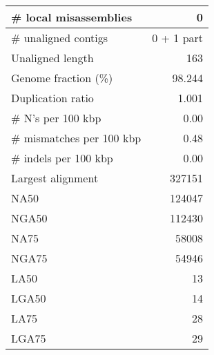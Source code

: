 \documentclass[12pt,a4paper]{article}
\begin{document}
\begin{table}[ht]
\begin{center}
\begin{tabular}{|l*{1}{|r}|}
\# local misassemblies & 0 \\ \hline
\# unaligned contigs & 0 + 1 part \\ \hline
Unaligned length & 163 \\ \hline
Genome fraction (\%) & 98.244 \\ \hline
Duplication ratio & 1.001 \\ \hline
\# N's per 100 kbp & 0.00 \\ \hline
\# mismatches per 100 kbp & 0.48 \\ \hline
\# indels per 100 kbp & 0.00 \\ \hline
Largest alignment & 327151 \\ \hline
NA50 & 124047 \\ \hline
NGA50 & 112430 \\ \hline
NA75 & 58008 \\ \hline
NGA75 & 54946 \\ \hline
LA50 & 13 \\ \hline
LGA50 & 14 \\ \hline
LA75 & 28 \\ \hline
LGA75 & 29 \\ \hline
\end{tabular}
\end{center}
\end{table}
\end{document}
